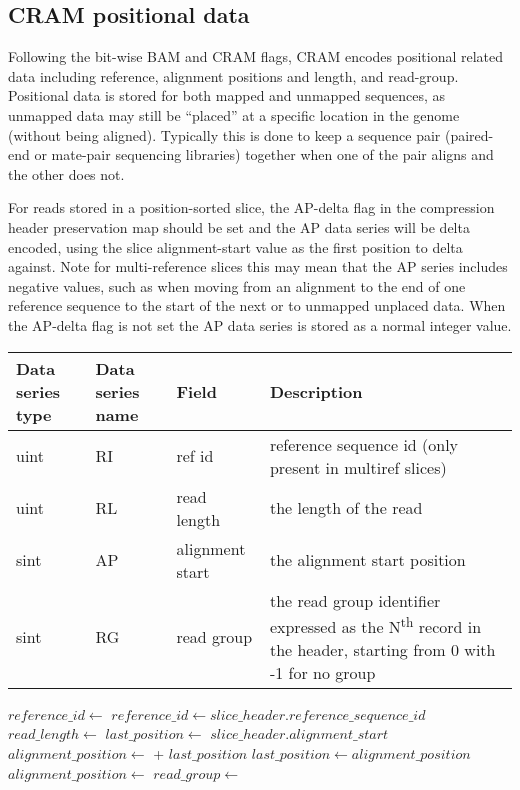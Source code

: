 \documentclass[a4paper]{article}
\begin{document}
\subsection{CRAM positional data}
\label{subsec:positions}

Following the bit-wise BAM and CRAM flags, CRAM encodes positional related data including reference, alignment positions and length, and read-group.
Positional data is stored for both mapped and unmapped sequences, as unmapped data may still be ``placed'' at a specific location in the genome (without being aligned).
Typically this is done to keep a sequence pair (paired-end or mate-pair sequencing libraries) together when one of the pair aligns and the other does not.

For reads stored in a position-sorted slice, the AP-delta flag in the compression header preservation map should be set and the AP data series will be delta encoded, using the slice alignment-start value as the first position to delta against.
Note for multi-reference slices this may mean that the AP series includes negative values, such as when moving from an alignment to the end of one reference sequence to the start of the next or to unmapped unplaced data.  When the AP-delta flag is not set the AP data series is stored as a normal integer value.

\begin{tabular}{|>{\raggedright}p{70pt}|>{\raggedright}p{75pt}|>{\raggedright}p{90pt}|>{\raggedright}p{171pt}|}
\hline
\textbf{Data series type} & \textbf{Data series name} & \textbf{Field} & \textbf{Description}\tabularnewline
\hline
uint & RI & ref id & reference sequence id (only present in multiref slices)\tabularnewline
\hline
uint & RL & read length & the length of the read\tabularnewline
\hline
sint & AP & alignment start & the alignment start position\tabularnewline
\hline
sint & RG & read group & the read group identifier expressed as the N\textsuperscript{th} record in the header, starting from 0 with -1 for no group\tabularnewline
\hline
\end{tabular}

\vskip 20pt
\begin{algorithmic}[1]
  \State $reference\_id\gets$ 
\Else
  \State $reference\_id\gets slice\_header.reference\_sequence\_id$
\EndIf
\State $read\_length \gets$ 
        \State $last\_position\gets$ $slice\_header.alignment\_start$
    \EndIf
    \State $alignment\_position \gets$  + $last\_position$
    \State $last\_position \gets alignment\_position$
\Else
    \State $alignment\_position \gets$ 
\EndIf
\State $read\_group \gets$ 
\EndProcedure
\end{algorithmic}
\end{document}
